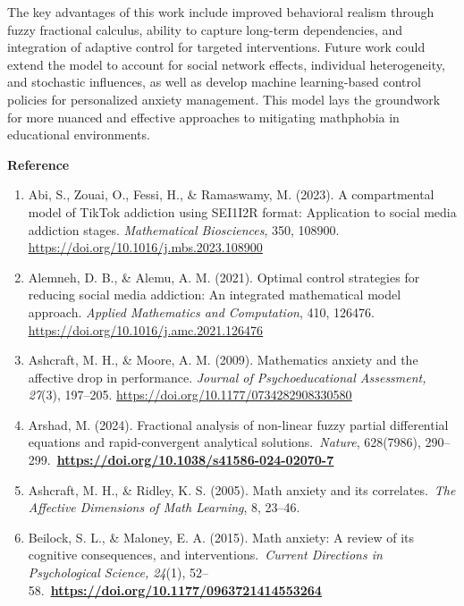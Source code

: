 The key advantages of this work include improved behavioral realism through fuzzy fractional calculus, ability to capture long-term dependencies, and integration of adaptive control for targeted interventions. Future work could extend the model to account for social network effects, individual heterogeneity, and stochastic influences, as well as develop machine learning-based control policies for personalized anxiety management. This model lays the groundwork for more nuanced and effective approaches to mitigating mathphobia in educational environments.

\textbf{Reference}

\begin{enumerate}
\def\labelenumi{\arabic{enumi}.}
\item
  Abi, S., Zouai, O., Fessi, H., \& Ramaswamy, M. (2023). A compartmental model of TikTok addiction using SEI1I2R format: Application to social media addiction stages. \emph{Mathematical Biosciences}, 350, 108900. \href{https://doi.org/10.1016/j.mbs.2023.108900}{\ul{https://doi.org/10.1016/j.mbs.2023.108900}}
\item
  Alemneh, D. B., \& Alemu, A. M. (2021). Optimal control strategies for reducing social media addiction: An integrated mathematical model approach. \emph{Applied Mathematics and Computation}, 410, 126476. \href{https://doi.org/10.1016/j.amc.2021.126476}{\ul{https://doi.org/10.1016/j.amc.2021.126476}}
\item
  Ashcraft, M. H., \& Moore, A. M. (2009). Mathematics anxiety and the affective drop in performance. \emph{Journal of Psychoeducational Assessment, 27}(3), 197--205. \href{https://doi.org/10.1177/0734282908330580}{\ul{https://doi.org/10.1177/0734282908330580}}
\item
  Arshad, M. (2024). Fractional analysis of non-linear fuzzy partial differential equations and rapid-convergent analytical solutions.~\emph{Nature}, 628(7986), 290--299.~\href{https://doi.org/10.1038/s41586-024-02070-7}{\textbf{\ul{https://doi.org/10.1038/s41586-024-02070-7}}}
\item
  Ashcraft, M. H., \& Ridley, K. S. (2005). Math anxiety and its correlates.~\emph{The Affective Dimensions of Math Learning}, 8, 23--46.
\item
  Beilock, S. L., \& Maloney, E. A. (2015). Math anxiety: A review of its cognitive consequences, and interventions.~\emph{Current Directions in Psychological Science, 24}(1), 52--58.~\href{https://doi.org/10.1177/0963721414553264}{\textbf{\ul{https://doi.org/10.1177/0963721414553264}}}

\end{enumerate}
